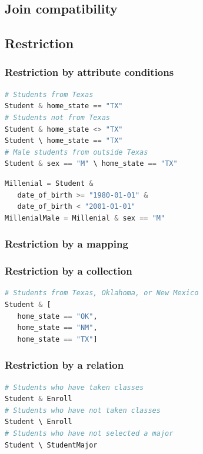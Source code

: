 \documentclass[letter,10pt]{article}
\begin{document}
\subsection{Join compatibility}
\subsection{Restriction}
\subsubsection{Restriction by attribute conditions}
\begin{lstlisting}[language=Python, caption={Restrictions by attribute conditions.}, label={lst:res1}]
# Students from Texas
Student & home_state == "TX"
# Students not from Texas
Student & home_state <> "TX"
Student \ home_state == "TX"
# Male students from outside Texas
Student & sex == "M" \ home_state == "TX"
\end{lstlisting}

\begin{lstlisting}[language=Python, caption={Assignment and use of relational variables.}, label={lst:res2}]
Millenial = Student & 
   date_of_birth >= "1980-01-01" & 
   date_of_birth < "2001-01-01"
MillenialMale = Millenial & sex == "M"
\end{lstlisting}

\subsubsection{Restriction by a mapping}

\subsubsection{Restriction by a collection}
\begin{lstlisting}[language=Python, caption={Restrictions by a collection of conditions.}, label={lst:res4}]
# Students from Texas, Oklahoma, or New Mexico
Student & [
   home_state == "OK", 
   home_state == "NM", 
   home_state == "TX"] 
\end{lstlisting}


\subsubsection{Restriction by a relation}
\begin{lstlisting}[language=Python, caption={Restrictions by another entity.}, label={lst:res5}]
# Students who have taken classes
Student & Enroll
# Students who have not taken classes
Student \ Enroll
# Students who have not selected a major
Student \ StudentMajor
\end{lstlisting}
\end{document}
